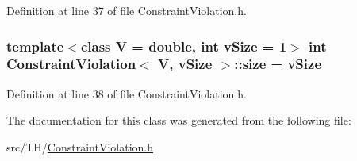 Definition at line 37 of file Constraint\+Violation.\+h.

\subsubsection[{\texorpdfstring{size}{size}}]{\setlength{\rightskip}{0pt plus 5cm}template$<$class V = double, int v\+Size = 1$>$ int {\bf Constraint\+Violation}$<$ V, v\+Size $>$\+::size = v\+Size}\hypertarget{structConstraintViolation_a2b1b8e70ce695b7d99cc2b31eb6a0cd9}{}\label{structConstraintViolation_a2b1b8e70ce695b7d99cc2b31eb6a0cd9}


Definition at line 38 of file Constraint\+Violation.\+h.



The documentation for this class was generated from the following file\+:\begin{DoxyCompactItemize}
\item 
src/\+T\+H/\hyperlink{ConstraintViolation_8h}{Constraint\+Violation.\+h}\end{DoxyCompactItemize}
